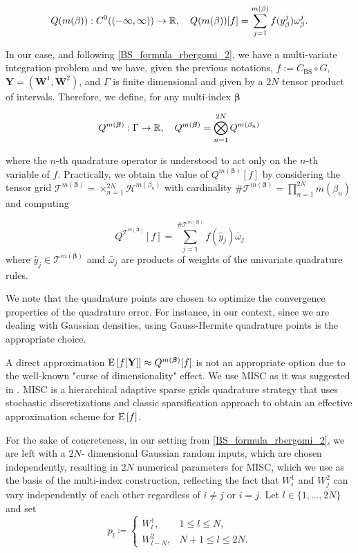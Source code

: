 \begin{equation}
Q(m(\beta)):C^0((-\infty,\infty)) \rightarrow \mathbb{R}, \quad Q(m(\beta))[f]= \sum_{j=1}^{m(\beta)} f(y^j_\beta) \omega_\beta^j.
\end{equation}





In our case, and following \eqref{BS_formula_rbergomi_2}, we have a multi-variate integration problem and  we have, given the previous notations,    $f:=C_{\text{BS}}\circ G$, $\mathbf{Y}=(\mathbf{W}^1,\mathbf{W}^2)$, and  $\Gamma$  is finite dimensional and given by a $2N$ tensor product of intervals.  Therefore,  we define, for any multi-index $\boldsymbol{\beta}$

$$Q^{m(\boldsymbol{\beta})}: \Gamma \rightarrow \mathbb{R},\quad  Q^{m(\boldsymbol{\beta})}= \bigotimes_{n = 1}^{2N} Q^{m(\beta_n)} $$

where the $n$-th quadrature operator is understood to act only on the $n$-th variable of $f$. Practically, we obtain the value of $Q^{m(\boldsymbol{\beta})}[f]$  by considering the tensor grid $\mathcal{T}^{m(\boldsymbol{\beta})}= \times_{n = 1}^{2N}  \mathcal{H}^{m(\beta_n)}$ with cardinality $\#\mathcal{T}^{m(\boldsymbol{\beta})}=\prod_{n=1}^{2N} m (\beta_n)$ and computing

$$ Q^{\mathcal{T}^{m(\boldsymbol{\beta})}}[f]= \sum_{j=1}^{\#\mathcal{T}^{m(\boldsymbol{\beta})}} f(\hat{y}_j) \bar{\omega}_j$$
where $\hat{y}_j \in \mathcal{T}^{m(\boldsymbol{\beta})}$ amd $\bar{\omega}_j$ are  products of weights of the univariate quadrature rules.
\begin{remark}
We note that the quadrature points are chosen to optimize the convergence properties of the quadrature error.  For instance, in our context, since we are dealing with Gaussian densities, using Gauss-Hermite quadrature points is the appropriate choice.
\end{remark}

A direct approximation $\mathrm{E}\left[f[\mathbf{Y}]\right] \approx Q^{m(\boldsymbol{\beta})}[f]$ is not an appropriate option  due to the well-known "curse of dimensionality" effect. We use MISC as it was suggested  in \cite{haji2016multi}. MISC is a hierarchical adaptive sparse grids quadrature strategy that uses  stochastic discretizations  and classic sparsification approach to obtain an effective approximation scheme for $\mathrm{E}\left[f\right]$. 

 For the sake
of concreteness, in our setting from \eqref{BS_formula_rbergomi_2}, we are left with a $2N$- dimensional Gaussian random inputs, which are chosen independently, resulting in  $2N$ numerical parameters for MISC, which we use as the basis of the multi-index construction, reflecting the fact that $W^1_i$ and $W^2_j$ can vary independently of each other regardless of $i \neq j$ or $i = j$. Let $l \in \{1, \ldots, 2N\}$ and set
\begin{equation}
p_l \coloneqq
\begin{cases}
W^1_l, & 1 \le l \le N,\\
W^2_{l-N}, & N+1 \le l \le 2N.
\end{cases}
\end{equation}


